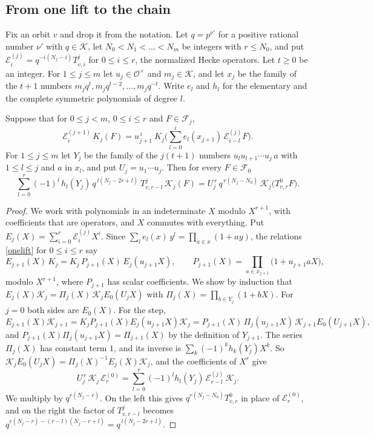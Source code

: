 \subsection{From one lift to the chain}\label{sec:inversion}

Fix an orbit $v$ and drop it from the notation. Let $q=p^{\nu'}$ for a positive rational number $\nu'$ with $q\in\mathcal K$, let $N_0<N_1<\dots<N_m$ be integers with $r\le N_0$, and put $\mathcal E^{(j)}_i=q^{-i(N_j-i)}T^j_{v,i}$ for $0\le i\le r$, the normalized Hecke operators. Let $t\ge0$ be an integer. For $1\le j\le m$ let $u_j\in\mathcal O^\times$ and $m_j\in\mathcal K$, and let $x_j$ be the family of the $t+1$ numbers $m_jq^{t},m_jq^{t-2},\dots,m_jq^{-t}$. Write $e_l$ and $h_l$ for the elementary and the complete symmetric polynomials of degree $l$.

\begin{proposition}\label{inversion}
Suppose that for $0\le j<m$, $0\le i\le r$ and $F\in\mathcal F_j$,
\begin{equation}\label{onelift}
\mathcal E^{(j+1)}_i\,K_j(F)=u_{j+1}^{\,i}\ K_j\Big(\sum_{l=0}^ie_l(x_{j+1})\,\mathcal E^{(j)}_{i-l}F\Big).
\end{equation}
For $1\le j\le m$ let $Y_j$ be the family of the $j(t+1)$ numbers $u_lu_{l+1}\cdots u_j\,a$ with $1\le l\le j$ and $a$ in $x_l$, and put $U_j=u_1\cdots u_j$. Then for every $F\in\mathcal F_0$
\[
\sum_{l=0}^r(-1)^l\,h_l(Y_j)\,q^{\,l(N_j-2r+l)}\ T^j_{v,r-l}\,\mathcal K_j(F)=U_j^{\,r}\,q^{\,r(N_j-N_0)}\ \mathcal K_j\big(T^0_{v,r}F\big).
\]
\end{proposition}

\begin{proof}
We work with polynomials in an indeterminate $X$ modulo $X^{r+1}$, with coefficients that are operators, and $X$ commutes with everything. Put $E_j(X)=\sum_{i=0}^r\mathcal E^{(j)}_iX^i$. Since $\sum_le_l(x)\,y^l=\prod_{a\in x}(1+ay)$, the relations \eqref{onelift} for $0\le i\le r$ say
\[
E_{j+1}(X)\,K_j=K_j\,P_{j+1}(X)\,E_j(u_{j+1}X),\qquad P_{j+1}(X)=\prod_{a\in x_{j+1}}\big(1+u_{j+1}aX\big),
\]
modulo $X^{r+1}$, where $P_{j+1}$ has scalar coefficients. We show by induction that $E_j(X)\mathcal K_j=\Pi_j(X)\,\mathcal K_jE_0(U_jX)$ with $\Pi_j(X)=\prod_{b\in Y_j}(1+bX)$. For $j=0$ both sides are $E_0(X)$. For the step,
\[
E_{j+1}(X)\mathcal K_{j+1}=K_jP_{j+1}(X)E_j(u_{j+1}X)\mathcal K_j=P_{j+1}(X)\,\Pi_j(u_{j+1}X)\,\mathcal K_{j+1}E_0(U_{j+1}X),
\]
and $P_{j+1}(X)\Pi_j(u_{j+1}X)=\Pi_{j+1}(X)$ by the definition of $Y_{j+1}$. The series $\Pi_j(X)$ has constant term $1$, and its inverse is $\sum_k(-1)^kh_k(Y_j)X^k$. So $\mathcal K_jE_0(U_jX)=\Pi_j(X)^{-1}E_j(X)\mathcal K_j$, and the coefficients of $X^r$ give
\[
U_j^{\,r}\,\mathcal K_j\,\mathcal E^{(0)}_r=\sum_{l=0}^r(-1)^lh_l(Y_j)\,\mathcal E^{(j)}_{r-l}\,\mathcal K_j .
\]
We multiply by $q^{r(N_j-r)}$. On the left this gives $q^{r(N_j-N_0)}T^0_{v,r}$ in place of $\mathcal E^{(0)}_r$, and on the right the factor of $T^j_{v,r-l}$ becomes $q^{r(N_j-r)-(r-l)(N_j-r+l)}=q^{\,l(N_j-2r+l)}$.
\end{proof}

